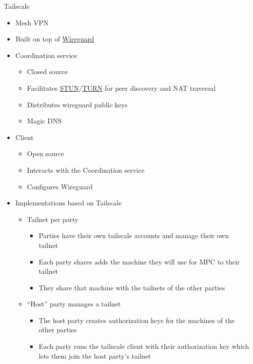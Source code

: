 \label{notes__02052-tailscale.md}
\begin{block}{Tailscale}
\label{notes__02052-tailscale.md__tailscale}
\begin{itemize}
\tightlist
\item
  Mesh VPN
\item
  Built on top of \hyperlink{notes__02051-wireguard.md}{Wireguard}
\item
  Coordination service

  \begin{itemize}
  \tightlist
  \item
    Closed source
  \item
    Facilitates \href{notes/0202-nat\#Session\%20Traversal\%20Utilities\%20for\%20NAT\%20(STUN)}{STUN}/\hyperlink{notes__02021-internet-protocol.md__test}{TURN} for peer discovery and NAT traversal
  \item
    Distributes wireguard public keys
  \item
    Magic DNS
  \end{itemize}
\item
  Client

  \begin{itemize}
  \tightlist
  \item
    Open source
  \item
    Interacts with the Coordination service
  \item
    Configures Wireguard
  \end{itemize}
\item
  Implementations based on Tailscale

  \begin{itemize}
  \tightlist
  \item
    Tailnet per party

    \begin{itemize}
    \tightlist
    \item
      Parties have their own tailscale accounts and manage their own tailnet
    \item
      Each party shares adds the machine they will use for MPC to their tailnet
    \item
      They share that machine with the tailnets of the other parties
    \end{itemize}
  \item
    ``Host'' party manages a tailnet

    \begin{itemize}
    \tightlist
    \item
      The host party creates authorization keys for the machines of the other parties
    \item
      Each party runs the tailscale client with their authorization key which lets them join the host party's tailnet
    \end{itemize}
  \end{itemize}
\end{itemize}
\end{block}

